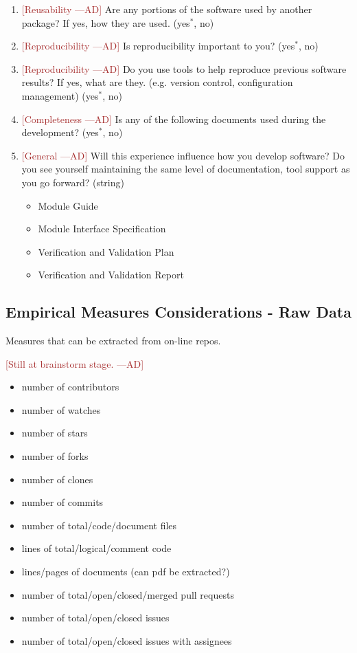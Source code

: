 \documentclass[letterpaper,cleveref]{lipics-v2019}
\newcommand{\authornote}[3]{\textcolor{#1}{[#3 ---#2]}}
\newcommand{\authornote}[3]{}
\newcommand{\ad}[1]{\authornote{brown}{AD}{#1}} %
\theoremstyle{definition}
\begin{document}
\begin{enumerate}
\item \ad{Reusability} Are any portions of the software used by another package?
  If yes, how they are used. ({yes$^*$, no})
\item \ad{Reproducibility} Is reproducibility important to you? ({yes$^*$, no})
\item \ad{Reproducibility} Do you use tools to help reproduce previous software
  results? If yes, what are they. (e.g. version control, configuration
  management) ({yes$^*$, no})
\item \ad{Completeness} Is any of the following documents used during the
  development? ({yes$^*$, no})
\item \ad{General} Will this experience influence how you develop software? Do
  you see yourself maintaining the same level of documentation, tool support as
  you go forward? (string)
\begin{itemize}
\item Module Guide
\item Module Interface Specification
\item Verification and Validation Plan
\item Verification and Validation Report
\end{itemize}
\end{enumerate}

\subsection{Empirical Measures Considerations - Raw Data}

Measures that can be extracted from on-line repos.

\ad{Still at brainstorm stage.}
\begin{itemize}
\item number of contributors
\item number of watches
\item number of stars
\item number of forks
\item number of clones
\item number of commits
\item number of total/code/document files
\item lines of total/logical/comment code
\item lines/pages of documents (can pdf be extracted?)
\item number of total/open/closed/merged pull requests
\item number of total/open/closed issues
\item number of total/open/closed issues with assignees
\end{itemize}
\end{document}

